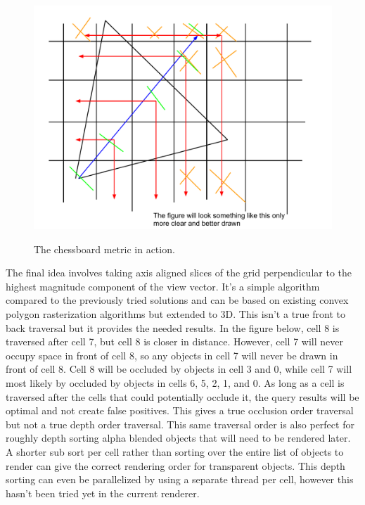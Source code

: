 \documentclass[12pt]{ucthesis}
\newcommand{\captionfonts}{\small\bf\ssp}
\begin{document}
\begin{figure}
\begin{center}
\includegraphics[width=\textwidth]{Images/chess-metric.pdf}
\captionfonts
\caption[Chessboard Metric]{The chessboard metric in action.}
\label{fig:chess-metric}
\end{center}
\end{figure}

The final idea involves taking axis aligned slices of the grid perpendicular to the highest magnitude component of the view vector.
It's a simple algorithm compared to the previously tried solutions and can be based on existing convex polygon rasterization algorithms but extended to 3D.
This isn't a true front to back traversal but it provides the needed results.
In the figure below, cell 8 is traversed after cell 7, but cell 8 is closer in distance.
However, cell 7 will never occupy space in front of cell 8, so any objects in cell 7 will never be drawn in front of cell 8.
Cell 8 will be occluded by objects in cell 3 and 0, while cell 7 will most likely by occluded by objects in cells 6, 5, 2, 1, and 0.
As long as a cell is traversed after the cells that could potentially occlude it, the query results will be optimal and not create false positives.
This gives a true occlusion order traversal but not a true depth order traversal.
This same traversal order is also perfect for roughly depth sorting alpha blended objects that will need to be rendered later.
A shorter sub sort per cell rather than sorting over the entire list of objects to render can give the correct rendering order for transparent objects.
This depth sorting can even be parallelized by using a separate thread per cell, however this hasn't been tried yet in the current renderer.
\end{document}
